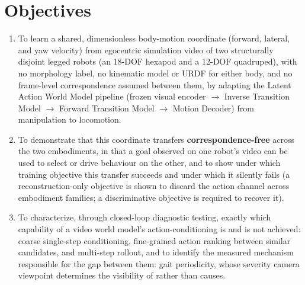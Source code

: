 \documentclass[12pt,a4paper,oneside]{report}
\begin{document}
\newpage
\section{Objectives}
\begin{enumerate}[label=\arabic*.]
\item To learn a shared, dimensionless body-motion coordinate (forward, lateral, and yaw velocity) from egocentric
  simulation video of two structurally disjoint legged robots (an 18-DOF hexapod and a 12-DOF quadruped), with no
  morphology label, no kinematic model or URDF for either body, and no frame-level correspondence assumed between
  them, by adapting the Latent Action World Model pipeline (frozen visual encoder $\to$ Inverse Transition Model
  $\to$ Forward Transition Model $\to$ Motion Decoder) from manipulation to locomotion.
\item To demonstrate that this coordinate transfers \textbf{correspondence-free} across the two embodiments, in that
  a goal observed on one robot's video can be used to select or drive behaviour on the other, and to show
  under which training objective this transfer succeeds and under which it silently fails (a reconstruction-only
  objective is shown to discard the action channel across embodiment families; a discriminative objective is
  required to recover it).
\item To characterize, through closed-loop diagnostic testing, exactly which capability of a video world model's
  action-conditioning is and is not achieved: coarse single-step conditioning, fine-grained action ranking between
  similar candidates, and multi-step rollout, and to identify the measured mechanism responsible for the gap
  between them: gait periodicity, whose severity camera viewpoint determines the visibility of rather than causes.
\end{enumerate}
\end{document}
